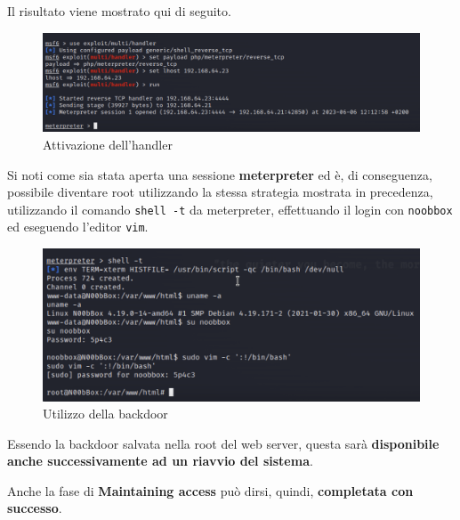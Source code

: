 \documentclass[a4paper, 12pt, oneside]{article}
\begin{document}
Il risultato viene mostrato qui di seguito.

\begin{figure}[h!]
    \centering
    \includegraphics[width=\textwidth]{img/handler.png}
    \caption{Attivazione dell'handler}
\end{figure}

Si noti come sia stata aperta una sessione \textbf{meterpreter} ed è, di conseguenza, possibile diventare root utilizzando la stessa strategia mostrata in precedenza, utilizzando il comando \texttt{shell -t} da meterpreter, effettuando il login con \texttt{noobbox} ed eseguendo l'editor \texttt{vim}.

\newpage
\begin{figure}[h!]
    \centering
    \includegraphics[width=\textwidth]{img/backdoor_root.png}
    \caption{Utilizzo della backdoor}
\end{figure}

Essendo la backdoor salvata nella root del web server, questa sarà \textbf{disponibile anche successivamente ad un riavvio del sistema}.

Anche la fase di \textbf{Maintaining access} può dirsi, quindi, \textbf{completata con successo}.

\newpage
\printbibliography[title={Riferimenti bibliografici e risorse consultate}]
\end{document}
